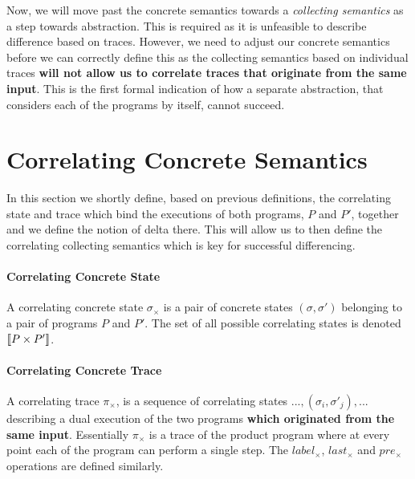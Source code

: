 Now, we will move past the concrete semantics towards a \emph{collecting semantics} as a step towards abstraction. This is required as it is unfeasible to describe difference based on traces. However, we need to adjust our concrete semantics before we can correctly define this as the collecting semantics based on individual traces \textbf{will not allow us to correlate traces that originate from the same input}. This is the first formal indication of how a separate abstraction, that considers each of the programs by itself, cannot succeed.

\section{Correlating Concrete Semantics}

In this section we shortly define, based on previous definitions, the correlating state and trace which bind the executions of both programs, $P$ and $P'$, together and we define the notion of delta there. This will allow us to then define the correlating collecting semantics which is key for successful differencing.

\paragraph{Correlating Concrete State} 
A correlating concrete state $\sigma_{\times}$ is a pair of concrete states $(\sigma,\sigma')$ belonging to a pair of programs $P$ and $P'$. The set of all possible correlating states is denoted $\lbrack\!\lbrack P \times P' \rbrack\!\rbrack$.

\paragraph{Correlating Concrete Trace} 
A correlating trace $\pi_{\times}$, is a sequence of correlating states $...,(\sigma_i,\sigma'_j),...$ describing a dual execution of the two programs \textbf{which originated from the same input}. Essentially $\pi_{\times}$ is a trace of the product program where at every point each of the program can perform a single step. The $label_{\times}$, $last_{\times}$ and $pre_{\times}$ operations are defined similarly.

